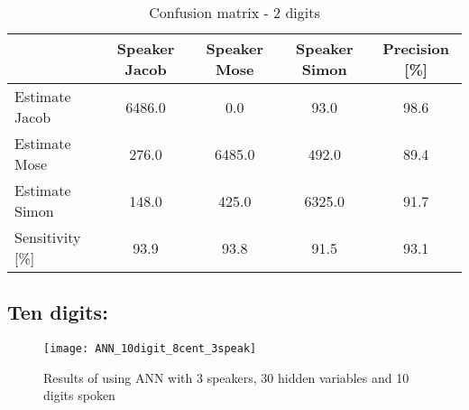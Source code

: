 \begin{table}[H]                                                    
\centering                                                          
\begin{tabular}{|l|c|c|c|c|}                                        
\hline                                                              
  & Speaker Jacob & Speaker Mose & Speaker Simon & Precision [\%] \\
\hline                                                              
Estimate Jacob & 6486.0 & 0.0 & 93.0 & 98.6 \\                      
\hline                                                              
Estimate Mose & 276.0 & 6485.0 & 492.0 & 89.4 \\                    
\hline                                                              
Estimate Simon & 148.0 & 425.0 & 6325.0 & 91.7 \\                   
\hline                                                              
Sensitivity [\%] & 93.9 & 93.8 & 91.5 & 93.1 \\                     
\hline                                                              
\end{tabular}                                                       
\caption{Confusion matrix - 2 digits}                               
\label{table:ANN_conf_2}                                            
\end{table}



\subsection{Ten digits:}
\begin{figure}[H]
\centering
\texttt{[image: ANN\_10digit\_8cent\_3speak]}
\caption{Results of using ANN with 3 speakers, 30 hidden variables and 10 digits spoken}
\label{fig:ANN_fig_10}
\end{figure}


